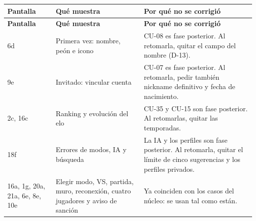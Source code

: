 \begin{center}\small
\begin{longtable}{|L{0.16\textwidth}|L{0.25\textwidth}|L{0.49\textwidth}|}
\hline
\textbf{Pantalla} & \textbf{Qué muestra} & \textbf{Por qué no se corrigió} \\ \hline
\endfirsthead
\hline
\textbf{Pantalla} & \textbf{Qué muestra} & \textbf{Por qué no se corrigió} \\ \hline
\endhead
6d & Primera vez: nombre, peón e icono & \mbox{CU-08} es fase posterior. Al retomarla, quitar el campo del nombre (\mbox{D-13}). \\ \hline
9e & Invitado: vincular cuenta & \mbox{CU-07} es fase posterior. Al retomarla, pedir también nickname definitivo y fecha de nacimiento. \\ \hline
2c, 16c & Ranking y evolución del elo & \mbox{CU-35} y \mbox{CU-15} son fase posterior. Al retomarlas, quitar las temporadas. \\ \hline
18f & Errores de modos, IA y búsqueda & La IA y los perfiles son fase posterior. Al retomarla, quitar el límite de cinco sugerencias y los perfiles privados. \\ \hline
16a, 1g, 20a, 21a, 6e, 8e, 10e & Elegir modo, VS, partida, muro, reconexión, cuatro jugadores y aviso de sanción & Ya coinciden con los casos del núcleo: se usan tal como están. \\ \hline
\end{longtable}
\end{center}
